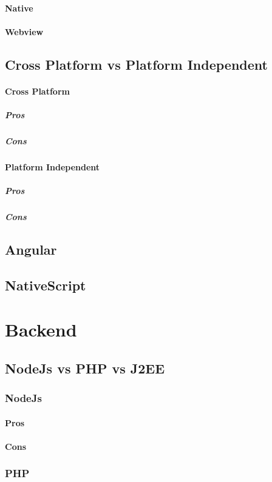 \documentclass[11pt, openany]{report}
\begin{document}
      \paragraph{Native}
      \paragraph{Webview}
    \subsection{ Cross Platform vs Platform Independent }
      \paragraph{Cross Platform}
        \subparagraph{Pros}
        \subparagraph{Cons}
      \paragraph{Platform Independent}
        \subparagraph{Pros}
        \subparagraph{Cons}
    \subsection{ Angular }
    \subsection{ NativeScript }
  \section{ Backend }
    \subsection{ NodeJs vs PHP vs J2EE }
      \subsubsection{NodeJs}
        \paragraph{Pros}
        \paragraph{Cons}
      \subsubsection{PHP}
\end{document}
